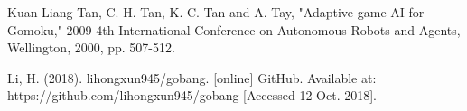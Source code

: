 \documentclass[9pt,shortpaper,twoside,web]{ieeecolor}
\begin{document}

\begin{thebibliography}{1}
Kuan Liang Tan, C. H. Tan, K. C. Tan and A. Tay, "Adaptive game AI for Gomoku," 2009 4th International Conference on Autonomous Robots and Agents, Wellington, 2000, pp. 507-512.

Li, H. (2018). lihongxun945/gobang. [online] GitHub. Available at: https://github.com/lihongxun945/gobang [Accessed 12 Oct. 2018].
\end{thebibliography}
\end{document}
